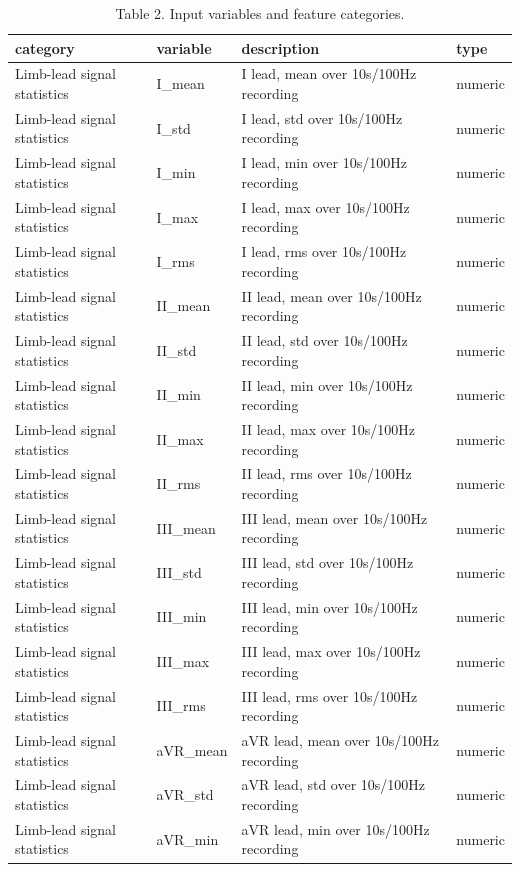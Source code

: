 \begin{table}[htbp]
\centering
\caption{Table 2. Input variables and feature categories.}
\label{table2_input_variables}
\begin{tabular}{llll}
\toprule
category & variable & description & type \\
\midrule
Limb-lead signal statistics & I\_mean & I lead, mean over 10s/100Hz recording & numeric \\
Limb-lead signal statistics & I\_std & I lead, std over 10s/100Hz recording & numeric \\
Limb-lead signal statistics & I\_min & I lead, min over 10s/100Hz recording & numeric \\
Limb-lead signal statistics & I\_max & I lead, max over 10s/100Hz recording & numeric \\
Limb-lead signal statistics & I\_rms & I lead, rms over 10s/100Hz recording & numeric \\
Limb-lead signal statistics & II\_mean & II lead, mean over 10s/100Hz recording & numeric \\
Limb-lead signal statistics & II\_std & II lead, std over 10s/100Hz recording & numeric \\
Limb-lead signal statistics & II\_min & II lead, min over 10s/100Hz recording & numeric \\
Limb-lead signal statistics & II\_max & II lead, max over 10s/100Hz recording & numeric \\
Limb-lead signal statistics & II\_rms & II lead, rms over 10s/100Hz recording & numeric \\
Limb-lead signal statistics & III\_mean & III lead, mean over 10s/100Hz recording & numeric \\
Limb-lead signal statistics & III\_std & III lead, std over 10s/100Hz recording & numeric \\
Limb-lead signal statistics & III\_min & III lead, min over 10s/100Hz recording & numeric \\
Limb-lead signal statistics & III\_max & III lead, max over 10s/100Hz recording & numeric \\
Limb-lead signal statistics & III\_rms & III lead, rms over 10s/100Hz recording & numeric \\
Limb-lead signal statistics & aVR\_mean & aVR lead, mean over 10s/100Hz recording & numeric \\
Limb-lead signal statistics & aVR\_std & aVR lead, std over 10s/100Hz recording & numeric \\
Limb-lead signal statistics & aVR\_min & aVR lead, min over 10s/100Hz recording & numeric \\

\end{tabular}
\end{table}
